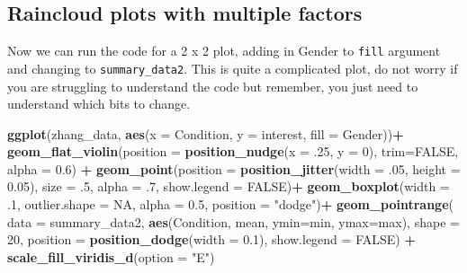 \documentclass[]{book}
\newenvironment{Shaded}{\begin{snugshade}}{\end{snugshade}}
\newcommand{\DataTypeTok}[1]{\textcolor[rgb]{0.13,0.29,0.53}{#1}}
\newcommand{\DecValTok}[1]{\textcolor[rgb]{0.00,0.00,0.81}{#1}}
\newcommand{\FloatTok}[1]{\textcolor[rgb]{0.00,0.00,0.81}{#1}}
\newcommand{\KeywordTok}[1]{\textcolor[rgb]{0.13,0.29,0.53}{\textbf{#1}}}
\newcommand{\NormalTok}[1]{#1}
\newcommand{\OperatorTok}[1]{\textcolor[rgb]{0.81,0.36,0.00}{\textbf{#1}}}
\newcommand{\OtherTok}[1]{\textcolor[rgb]{0.56,0.35,0.01}{#1}}
\newcommand{\StringTok}[1]{\textcolor[rgb]{0.31,0.60,0.02}{#1}}
\begin{document}
\hypertarget{raincloud-plots-with-multiple-factors}{%
\subsection{Raincloud plots with multiple factors}\label{raincloud-plots-with-multiple-factors}}

Now we can run the code for a 2 x 2 plot, adding in Gender to \texttt{fill} argument and changing to \texttt{summary\_data2}. This is quite a complicated plot, do not worry if you are struggling to understand the code but remember, you just need to understand which bits to change.

\begin{Shaded}
\begin{Highlighting}[]
\KeywordTok{ggplot}\NormalTok{(zhang_data, }\KeywordTok{aes}\NormalTok{(}\DataTypeTok{x =}\NormalTok{ Condition, }\DataTypeTok{y =}\NormalTok{ interest, }\DataTypeTok{fill =}\NormalTok{ Gender))}\OperatorTok{+}
\StringTok{  }\KeywordTok{geom_flat_violin}\NormalTok{(}\DataTypeTok{position =} \KeywordTok{position_nudge}\NormalTok{(}\DataTypeTok{x =} \FloatTok{.25}\NormalTok{, }\DataTypeTok{y =} \DecValTok{0}\NormalTok{), }
                   \DataTypeTok{trim=}\OtherTok{FALSE}\NormalTok{, }\DataTypeTok{alpha =} \FloatTok{0.6}\NormalTok{) }\OperatorTok{+}
\StringTok{  }\KeywordTok{geom_point}\NormalTok{(}\DataTypeTok{position =} \KeywordTok{position_jitter}\NormalTok{(}\DataTypeTok{width =} \FloatTok{.05}\NormalTok{, }\DataTypeTok{height =} \FloatTok{0.05}\NormalTok{), }
             \DataTypeTok{size =} \FloatTok{.5}\NormalTok{, }\DataTypeTok{alpha =} \FloatTok{.7}\NormalTok{, }\DataTypeTok{show.legend =} \OtherTok{FALSE}\NormalTok{)}\OperatorTok{+}
\StringTok{  }\KeywordTok{geom_boxplot}\NormalTok{(}\DataTypeTok{width =} \FloatTok{.1}\NormalTok{, }\DataTypeTok{outlier.shape =} \OtherTok{NA}\NormalTok{, }\DataTypeTok{alpha =} \FloatTok{0.5}\NormalTok{, }\DataTypeTok{position =} \StringTok{"dodge"}\NormalTok{)}\OperatorTok{+}
\StringTok{  }\KeywordTok{geom_pointrange}\NormalTok{(}
    \DataTypeTok{data =}\NormalTok{ summary_data2,}
    \KeywordTok{aes}\NormalTok{(Condition, mean, }\DataTypeTok{ymin=}\NormalTok{min, }\DataTypeTok{ymax=}\NormalTok{max),}
    \DataTypeTok{shape =} \DecValTok{20}\NormalTok{, }
    \DataTypeTok{position =} \KeywordTok{position_dodge}\NormalTok{(}\DataTypeTok{width =} \FloatTok{0.1}\NormalTok{),}
    \DataTypeTok{show.legend =} \OtherTok{FALSE}\NormalTok{) }\OperatorTok{+}
\StringTok{  }\KeywordTok{scale_fill_viridis_d}\NormalTok{(}\DataTypeTok{option =} \StringTok{"E"}\NormalTok{)}
\end{Highlighting}
\end{Shaded}
\end{document}
